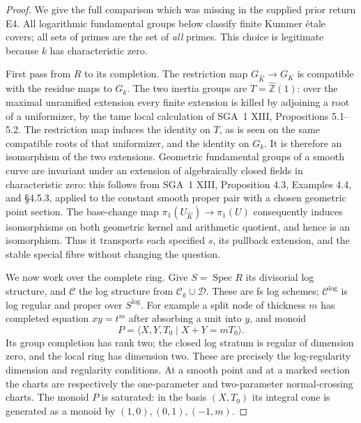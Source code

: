 \begin{proof}
We give the full comparison which was missing in the supplied prior
return E4. All logarithmic fundamental groups below classify finite
Kummer \'etale covers; all sets of primes are the set of \emph{all}
primes. This choice is legitimate because $k$ has characteristic
zero.

First pass from $R$ to its completion. The restriction map
$G_{\widehat K}\to G_K$ is compatible with the residue maps to
$G_k$. The two inertia groups are $T=\widehat{\mathbb Z}(1)$:
over the maximal unramified extension every finite extension is
killed by adjoining a root of a uniformizer, by the tame local
calculation of SGA~1 XIII, Propositions 5.1--5.2. The restriction
map induces the identity on $T$, as is seen on the same compatible
roots of that uniformizer, and the identity on $G_k$. It is therefore
an isomorphism of the two extensions. Geometric fundamental groups
of a smooth curve are invariant under an extension of algebraically
closed fields in characteristic zero: this follows from SGA~1 XIII,
Proposition 4.3, Examples 4.4, and \S4.5.3, applied to the
constant smooth proper pair with a chosen geometric point section.
The base-change map
$\pi_1(U_{\widehat K})\to\pi_1(U)$ consequently induces
isomorphisms on both geometric kernel and arithmetic quotient,
and hence is an isomorphism. Thus it transports each specified
$s$, its pullback extension, and the stable special fibre without
changing the question.

We now work over the complete ring. Give $S=\operatorname{Spec}R$
its divisorial log structure, and $\mathcal C$ the log structure
from $\mathcal C_k\cup\mathcal D$. These are fs log schemes;
$\mathcal C^{\log}$ is log regular and proper over $S^{\log}$.
For example a split node of thickness $m$ has completed equation
$xy=t^m$ after absorbing a unit into $y$, and monoid
\[
 P=\langle X,Y,T_0\mid X+Y=mT_0\rangle.
\]
Its group completion has rank two; the closed log stratum is
regular of dimension zero, and the local ring has dimension two.
These are precisely the log-regularity dimension and regularity
conditions. At a smooth point and at a marked section the charts
are respectively the one-parameter and two-parameter normal-crossing
charts. The monoid $P$ is saturated: in the basis $(X,T_0)$ its
integral cone is generated as a monoid by $(1,0),(0,1),(-1,m)$.


\end{proof}
